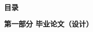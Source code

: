 \cleardoublepage
\begin{center}
    ~\\[-1.5em]
    \textbf{目\quad 录}
\end{center}

\noindent {}\textbf{第一部分 \quad 毕业论文（设计）}
\vspace{-1em}
\tableofcontents
